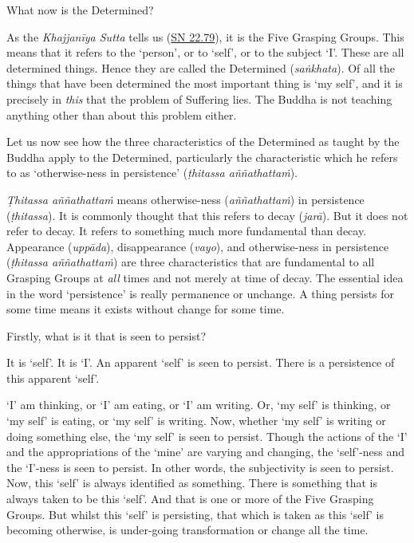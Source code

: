 What now is the Determined?

As the \textit{Khajjanīya Sutta} tells us (\href{https://suttacentral.net/sn22.79/en/bodhi}{SN 22.79}), it is the Five Grasping Groups. This means that it refers to the `person', or to `self', or to the subject `I'. These are all determined things. Hence they are called the Determined (\textit{saṅkhata}). Of all the things that have been determined the most important thing is `my self', and it is precisely in \emph{this} that the problem of Suffering lies. The Buddha is not teaching anything other than about this problem either.

Let us now see how the three characteristics of the Determined as taught by the Buddha apply to the Determined, particularly the characteristic which he refers to as `otherwise-ness in persistence' (\textit{ṭhitassa aññathattaṁ}).

\textit{Ṭhitassa aññathattaṁ} means otherwise-ness (\textit{aññathattaṁ}) in persistence (\textit{ṭhitassa}). It is commonly thought that this refers to decay (\textit{jarā}). But it does not refer to decay. It refers to something much more fundamental than decay. Appearance (\textit{uppāda}), disappearance (\textit{vayo}), and otherwise-ness in persistence (\textit{ṭhitassa aññathattaṁ}) are three characteristics that are fundamental to all Grasping Groups at \emph{all} times and not merely at time of decay. The essential idea in the word `persistence' is really permanence or unchange. A thing persists for some time means it exists without change for some time.

Firstly, what is it that is seen to persist?

It is `self'. It is `I'. An apparent `self' is seen to persist. There is a persistence of this apparent `self'.

`I' am thinking, or `I' am eating, or `I' am writing. Or, `my self' is thinking, or `my self' is eating, or `my self' is writing. Now, whether `my self' is writing or doing something else, the `my self' is seen to persist. Though the actions of the `I' and the appropriations of the `mine' are varying and changing, the `self'-ness and the `I'-ness is seen to persist. In other words, the subjectivity is seen to persist. Now, this `self' is always identified as something. There is something that is always taken to be this `self'. And that is one or more of the Five Grasping Groups. But whilst this `self' is persisting, that which is taken as this `self' is becoming otherwise, is under-going transformation or change all the time.

